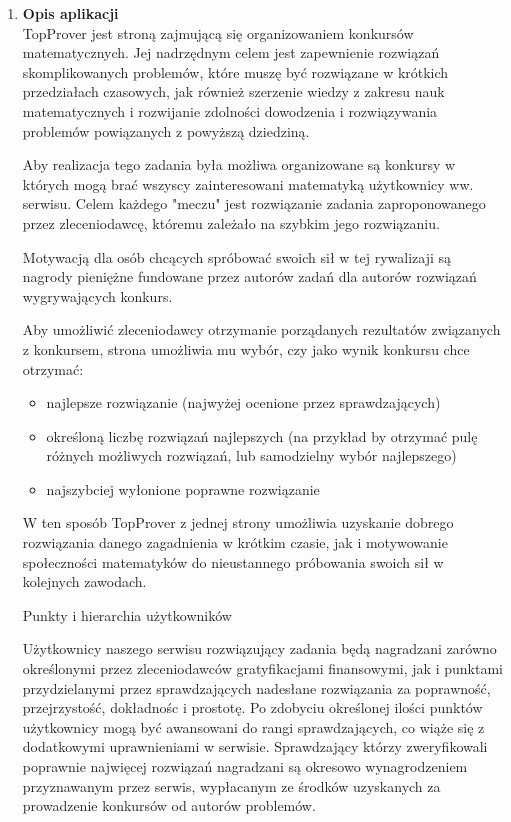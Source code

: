 \documentclass{article}
\newenvironment{nscenter}
 {\parskip=0pt\par\nopagebreak\centering}
 {\par\noindent\ignorespacesafterend}
\begin{document}
  
  \begin{enumerate}
   \item \textbf{Opis aplikacji}\\
TopProver jest stroną zajmującą się organizowaniem konkursów matematycznych. 
Jej nadrzędnym celem jest zapewnienie rozwiązań skomplikowanych problemów, 
które muszę być rozwiązane w krótkich przedziałach czasowych, jak również szerzenie wiedzy z zakresu
nauk matematycznych i rozwijanie zdolności dowodzenia i rozwiązywania problemów 
powiązanych z powyższą dziedziną.

Aby realizacja tego zadania była możliwa organizowane są konkursy w których mogą brać wszyscy
zainteresowani matematyką użytkownicy ww. serwisu. Celem każdego "meczu" jest rozwiązanie zadania 
zaproponowanego przez zleceniodawcę, któremu zależało na szybkim jego rozwiązaniu. 

Motywacją dla osób chcących spróbować swoich sił w tej rywalizaji są nagrody pieniężne fundowane przez 
autorów zadań dla autorów rozwiązań wygrywających konkurs.

Aby umożliwić zleceniodawcy otrzymanie porządanych rezultatów związanych z konkursem, strona umożliwia mu wybór,
czy jako wynik konkursu chce otrzymać:
\begin{itemize}
 \item najlepsze rozwiązanie (najwyżej ocenione przez sprawdzających)
 \item określoną liczbę rozwiązań najlepszych (na przykład by otrzymać pulę różnych możliwych rozwiązań, lub samodzielny wybór najlepszego)
 \item najszybciej wyłonione poprawne rozwiązanie
\end{itemize}

W ten sposób TopProver z jednej strony umożliwia uzyskanie dobrego rozwiązania danego zagadnienia w krótkim czasie,
jak i motywowanie społeczności matematyków do nieustannego próbowania swoich sił w kolejnych zawodach.\\
\hrulefill

\begin{nscenter}
Punkty i hierarchia użytkowników
\end{nscenter}
\newline
Użytkownicy naszego serwisu rozwiązujący zadania będą nagradzani zarówno określonymi przez zleceniodawców gratyfikacjami finansowymi,
jak i punktami przydzielanymi przez sprawdzających nadesłane rozwiązania za poprawność, przejrzystość, dokładnośc i prostotę.
Po zdobyciu określonej ilości punktów użytkownicy mogą być awansowani do rangi sprawdzających, co wiąże się z dodatkowymi uprawnieniami w serwisie.
Sprawdzający którzy zweryfikowali poprawnie najwięcej rozwiązań nagradzani są okresowo wynagrodzeniem przyznawanym przez serwis,
wypłacanym ze środków uzyskanych za prowadzenie konkursów od autorów problemów.


\end{enumerate}
\end{document}
